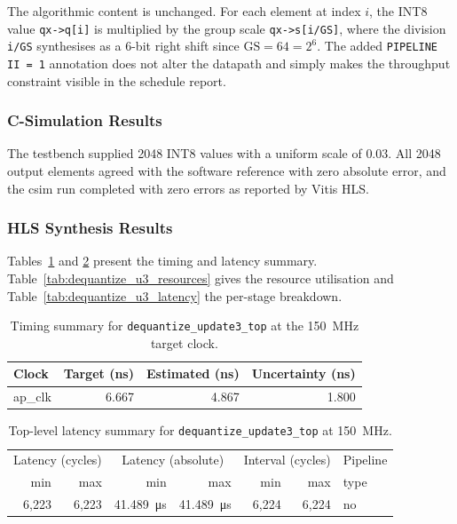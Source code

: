 The algorithmic content is unchanged. For each element at index $i$, the
INT8 value \texttt{qx->q[i]} is multiplied by the group scale
\texttt{qx->s[i/GS]}, where the division \texttt{i/GS} synthesises as
a 6-bit right shift since $\text{GS} = 64 = 2^6$. The added
\texttt{PIPELINE II\,=\,1} annotation does not alter the datapath and
simply makes the throughput constraint visible in the schedule report.

\subsubsection{C-Simulation Results}
\label{subsubsec:dequantize_update3_csim}

The testbench supplied 2048 INT8 values with a uniform scale of $0.03$.
All 2048 output elements agreed with the software reference with zero
absolute error, and the csim run completed with zero errors as reported
by Vitis HLS.

\subsubsection{HLS Synthesis Results}
\label{subsubsec:dequantize_update3_csyn}

Tables~\ref{tab:dequantize_u3_timing} and \ref{tab:dequantize_u3_top_latency}
present the timing and latency summary. Table~\ref{tab:dequantize_u3_resources}
gives the resource utilisation and Table~\ref{tab:dequantize_u3_latency} the
per-stage breakdown.

\begin{table}[H]
  \centering
  \begin{tabular}{lrrr}
    \toprule
    Clock & Target (ns) & Estimated (ns) & Uncertainty (ns) \\
    \midrule
    ap\_clk & 6.667 & 4.867 & 1.800 \\
    \bottomrule
  \end{tabular}
  \caption{Timing summary for \texttt{dequantize\_update3\_top} at the
           \SI{150}{\mega\hertz} target clock.}
  \label{tab:dequantize_u3_timing}
\end{table}

\begin{table}[H]
  \centering
  \begin{tabular}{rrrrrrl}
    \toprule
    \multicolumn{2}{c}{Latency (cycles)} &
    \multicolumn{2}{c}{Latency (absolute)} &
    \multicolumn{2}{c}{Interval (cycles)} & Pipeline \\
    min & max & min & max & min & max & type \\
    \midrule
    6{,}223 & 6{,}223 & \SI{41.489}{\micro\second} & \SI{41.489}{\micro\second} & 6{,}224 & 6{,}224 & no \\
    \bottomrule
  \end{tabular}
  \caption{Top-level latency summary for \texttt{dequantize\_update3\_top}
           at \SI{150}{\mega\hertz}.}
  \label{tab:dequantize_u3_top_latency}
\end{table}

